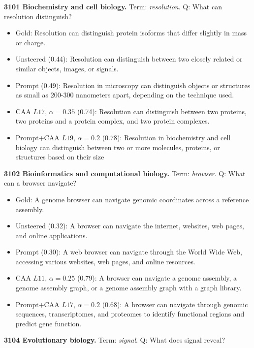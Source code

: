 \medskip\noindent\textbf{3101 Biochemistry and cell biology.} Term: \emph{resolution}.
Q: What can resolution distinguish?
\begin{itemize}\setlength{\itemsep}{0.15em}\setlength{\parsep}{0pt}\setlength{\topsep}{0.2em}
\item Gold: Resolution can distinguish protein isoforms that differ slightly in mass or charge.
\item Unsteered (0.44): Resolution can distinguish between two closely related or similar objects, images, or signals.
\item Prompt (0.49): Resolution in microscopy can distinguish objects or structures as small as 200-300 nanometers apart, depending on the technique used.
\item CAA $L17$, $\alpha=0.35$ (0.74): Resolution can distinguish between two proteins, two proteins and a protein complex, and two protein complexes.
\item Prompt+CAA $L19$, $\alpha=0.2$ (0.78): Resolution in biochemistry and cell biology can distinguish between two or more molecules, proteins, or structures based on their size
\end{itemize}
\medskip\noindent\textbf{3102 Bioinformatics and computational biology.} Term: \emph{browser}.
Q: What can a browser navigate?
\begin{itemize}\setlength{\itemsep}{0.15em}\setlength{\parsep}{0pt}\setlength{\topsep}{0.2em}
\item Gold: A genome browser can navigate genomic coordinates across a reference assembly.
\item Unsteered (0.32): A browser can navigate the internet, websites, web pages, and online applications.
\item Prompt (0.30): A web browser can navigate through the World Wide Web, accessing various websites, web pages, and online resources.
\item CAA $L11$, $\alpha=0.25$ (0.79): A browser can navigate a genome assembly, a genome assembly graph, or a genome assembly graph with a graph library.
\item Prompt+CAA $L17$, $\alpha=0.2$ (0.68): A browser can navigate through genomic sequences, transcriptomes, and proteomes to identify functional regions and predict gene function.
\end{itemize}
\medskip\noindent\textbf{3104 Evolutionary biology.} Term: \emph{signal}.
Q: What does signal reveal?
